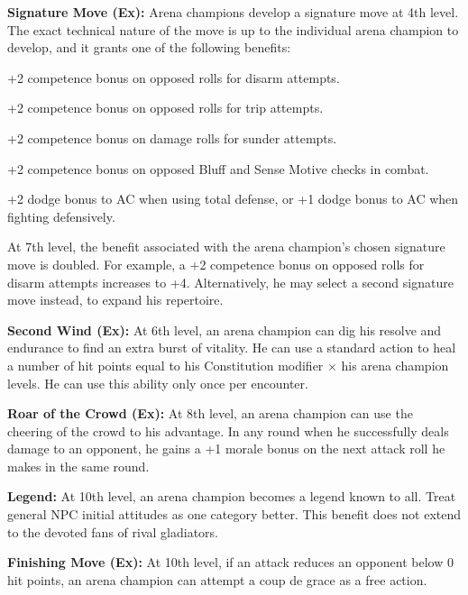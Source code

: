{\textbf{Signature Move (Ex):} Arena champions develop a signature move at 4th level. The exact technical nature of the move is up to the individual arena champion to develop, and it grants one of the following benefits:
\begin{itemize*}
\item +2 competence bonus on opposed rolls for disarm attempts.
\item +2 competence bonus on opposed rolls for trip attempts.
\item +2 competence bonus on damage rolls for sunder attempts.
\item +2 competence bonus on opposed Bluff and Sense Motive checks in combat.
\item +2 dodge bonus to AC when using total defense, or +1 dodge bonus to AC when fighting defensively.
\end{itemize*}

At 7th level, the benefit associated with the arena champion's chosen signature move is doubled. For example, a +2 competence bonus on opposed rolls for disarm attempts increases to +4. Alternatively, he may select a second signature move instead, to expand his repertoire.

\textbf{Second Wind (Ex):} At 6th level, an arena champion can dig his resolve and endurance to find an extra burst of vitality. He can use a standard action to heal a number of hit points equal to his Constitution modifier $\times$ his arena champion levels. He can use this ability only once per encounter.

\textbf{Roar of the Crowd (Ex):} At 8th level, an arena champion can use the cheering of the crowd to his advantage. In any round when he successfully deals damage to an opponent, he gains a +1 morale bonus on the next attack roll he makes in the same round.

\textbf{Legend:} At 10th level, an arena champion becomes a legend known to all. Treat general NPC initial attitudes as one category better. This benefit does not extend to the devoted fans of rival gladiators.

\textbf{Finishing Move (Ex):} At 10th level, if an attack reduces an opponent below 0 hit points, an arena champion can attempt a coup de grace as a free action.
}